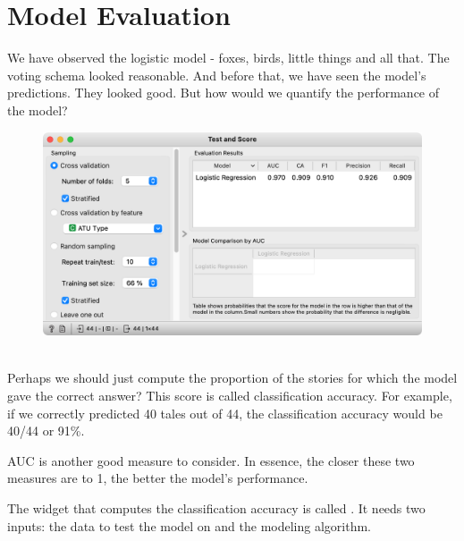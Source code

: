 \chapter{Model Evaluation}

We have observed the logistic model - foxes, birds, little things and all that. The voting schema looked reasonable. And before that, we have seen the model's predictions. They looked good. But how would we quantify the performance of the model?

\begin{figure}
    \includegraphics[scale=0.45]{test-and-score.png}
    \caption{$\;$}
\end{figure}

Perhaps we should just compute the proportion of the stories for which the model gave the correct answer? This score is called classification accuracy. For example, if we correctly predicted 40 tales out of 44, the classification accuracy would be 40/44 or 91\%.

AUC is another good measure to consider. In essence, the closer these two measures are to 1, the better the model's performance.

The widget that computes the classification accuracy is called . It needs two inputs: the data to test the model on and the modeling algorithm.

